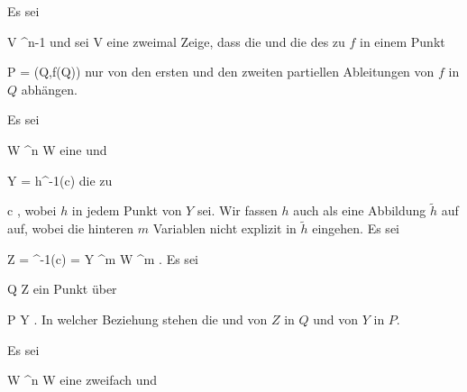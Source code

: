 {}
{

Es sei

\mavergleichskette
{\vergleichskette
{ V
}
{ \subseteq }{ \R^{n-1}
}
{  }{
}
{    }{
}
{   }{
}
}
{}{}{}
und sei
 { V } {\R
} {}
eine zweimal
Zeige, dass die
und die
des
zu $f$ in einem Punkt

\mavergleichskette
{\vergleichskette
{ P
}
{ = }{ (Q,f(Q))
}
{  }{
}
{    }{
}
{   }{
}
}
{}{}{}
nur von den ersten und den zweiten partiellen Ableitungen von $f$ in $Q$ abhängen.

}
{} {}

{}
{

Es sei

\mavergleichskette
{\vergleichskette
{ W
}
{ \subseteq }{ \R^n
}
{  }{
}
{    }{
}
{   }{
}
}
{}{}{}
 { W } { \R
} {}
eine
und

\mavergleichskette
{\vergleichskette
{ Y
}
{ = }{ h^{-1}(c)
}
{  }{
}
{    }{
}
{   }{
}
}
{}{}{}
die
zu

\mavergleichskette
{\vergleichskette
{ c
}
{ \in }{ \R
}
{  }{
}
{    }{
}
{   }{
}
}
{}{}{,}
wobei $h$ in jedem Punkt von $Y$
sei. Wir fassen $h$ auch als eine Abbildung $\tilde{h}$  auf
 auf, wobei die hinteren $m$ Variablen nicht explizit in $\tilde{h}$ eingehen. Es sei

\mavergleichskettedisp
{\vergleichskette
{ Z
}
{ =} { ^{-1}(c)
}
{ =} { Y \times \R^m
}
{ \subseteq} { W \times \R^{m}
}
{ } {
}
}
{}{}{.}
Es sei

\mavergleichskette
{\vergleichskette
{ Q
}
{ \in }{ Z
}
{  }{
}
{    }{
}
{   }{
}
}
{}{}{}
ein Punkt über

\mavergleichskette
{\vergleichskette
{ P
}
{ \in }{ Y
}
{  }{
}
{    }{
}
{   }{
}
}
{}{}{.}
In welcher Beziehung stehen die
und
von $Z$ in $Q$ und von $Y$ in $P$.

}
{} {}

Es sei

\mavergleichskette
{\vergleichskette
{ W
}
{ \subseteq }{ \R^n
}
{  }{
}
{    }{
}
{   }{
}
}
{}{}{}
 { W } { \R
} {}
eine zweifach
und

